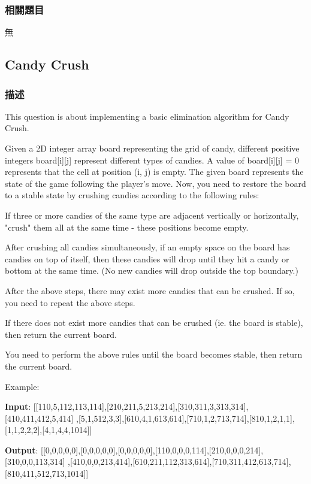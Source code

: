 \subsubsection{相關題目}
\begindot
\item 無
\myenddot

\subsection{Candy Crush}
\label{sec:candy-crush}

\subsubsection{描述}
This question is about implementing a basic elimination algorithm for Candy Crush.

Given a 2D integer array board representing the grid of candy, different positive integers board[i][j] represent different types of candies. A value of board[i][j] = 0 represents that the cell at position (i, j) is empty. The given board represents the state of the game following the player's move. Now, you need to restore the board to a stable state by crushing candies according to the following rules:

\begindot
\item If three or more candies of the same type are adjacent vertically or horizontally, "crush" them all at the same time - these positions become empty.
\item After crushing all candies simultaneously, if an empty space on the board has candies on top of itself, then these candies will drop until they hit a candy or bottom at the same time. (No new candies will drop outside the top boundary.)
\item After the above steps, there may exist more candies that can be crushed. If so, you need to repeat the above steps.
\item If there does not exist more candies that can be crushed (ie. the board is stable), then return the current board.
\myenddot

You need to perform the above rules until the board becomes stable, then return the current board.


Example:

\textbf{Input}:
       [[110,5,112,113,114],[210,211,5,213,214],[310,311,3,313,314],[410,411,412,5,414]
         ,[5,1,512,3,3],[610,4,1,613,614],[710,1,2,713,714],[810,1,2,1,1],[1,1,2,2,2],[4,1,4,4,1014]]

\textbf{Output}:
       [[0,0,0,0,0],[0,0,0,0,0],[0,0,0,0,0],[110,0,0,0,114],[210,0,0,0,214],[310,0,0,113,314]
         ,[410,0,0,213,414],[610,211,112,313,614],[710,311,412,613,714],[810,411,512,713,1014]]



